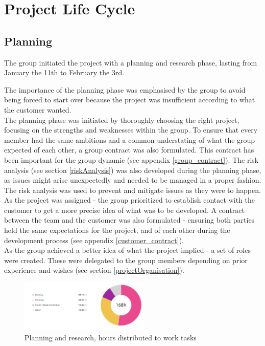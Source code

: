 
\chapter{Project Life Cycle}

\section{Planning}
The group initiated the project with a planning and research phase, lasting from January the 11th to February the 3rd. 

The importance of the planning phase was emphasised by the group to avoid being forced to start over because the project was insufficient according to what the customer wanted. \\

The planning phase was initiated by thoroughly choosing the right project, focusing on the strengths and weaknesses within the group. To ensure that every member had the same ambitions and a common understating of what the group expected of each other, a group contract was also formulated. This contract has been important for the group dynamic (see appendix \ref{group_contract}). The risk analysis (see section \ref{riskAnalysis}) was also developed during the planning phase, as issues might arise unexpectedly and needed to be managed in a proper fashion. The risk analysis was used to prevent and mitigate issues as they were to happen.  \\  

As the project was assigned - the group prioritized to establish contact with the customer to get a more precise idea of what was to be developed. A contract between the team and the customer was also formulated - ensuring both parties held the same expectations for the project, and of each other during the development process (see appendix \ref{customer_contract}).\\

As the group achieved a better idea of what the project implied - a set of roles were created. These were delegated to the group members depending on prior experience and wishes (see section \ref{projectOrganisation}).


\begin{figure}[t]
\centering
    \includegraphics[width=0.55\textwidth]{fig/planning-and-research-diagram}
\caption{Planning and research, hours distributed to work tasks}
\end{figure}


